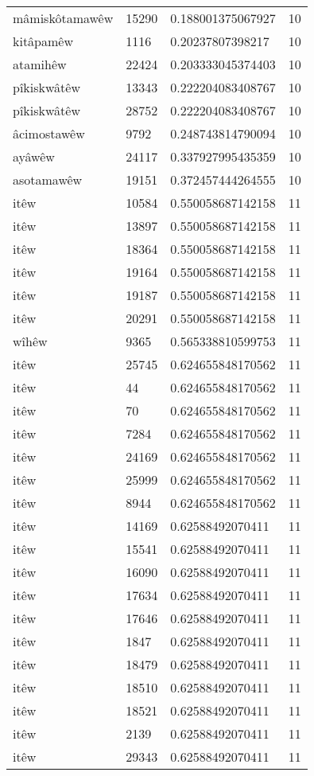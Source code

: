 \begin{longtable}{llll}
mâmiskôtamawêw & 15290 & 0.188001375067927 & 10\\
kitâpamêw & 1116 & 0.20237807398217 & 10\\
atamihêw & 22424 & 0.203333045374403 & 10\\
pîkiskwâtêw & 13343 & 0.222204083408767 & 10\\
pîkiskwâtêw & 28752 & 0.222204083408767 & 10\\
âcimostawêw & 9792 & 0.248743814790094 & 10\\
ayâwêw & 24117 & 0.337927995435359 & 10\\
asotamawêw & 19151 & 0.372457444264555 & 10\\
itêw & 10584 & 0.550058687142158 & 11\\
itêw & 13897 & 0.550058687142158 & 11\\
itêw & 18364 & 0.550058687142158 & 11\\
itêw & 19164 & 0.550058687142158 & 11\\
itêw & 19187 & 0.550058687142158 & 11\\
itêw & 20291 & 0.550058687142158 & 11\\
wîhêw & 9365 & 0.565338810599753 & 11\\
itêw & 25745 & 0.624655848170562 & 11\\
itêw & 44 & 0.624655848170562 & 11\\
itêw & 70 & 0.624655848170562 & 11\\
itêw & 7284 & 0.624655848170562 & 11\\
itêw & 24169 & 0.624655848170562 & 11\\
itêw & 25999 & 0.624655848170562 & 11\\
itêw & 8944 & 0.624655848170562 & 11\\
itêw & 14169 & 0.62588492070411 & 11\\
itêw & 15541 & 0.62588492070411 & 11\\
itêw & 16090 & 0.62588492070411 & 11\\
itêw & 17634 & 0.62588492070411 & 11\\
itêw & 17646 & 0.62588492070411 & 11\\
itêw & 1847 & 0.62588492070411 & 11\\
itêw & 18479 & 0.62588492070411 & 11\\
itêw & 18510 & 0.62588492070411 & 11\\
itêw & 18521 & 0.62588492070411 & 11\\
itêw & 2139 & 0.62588492070411 & 11\\
itêw & 29343 & 0.62588492070411 & 11\\

\end{longtable}
